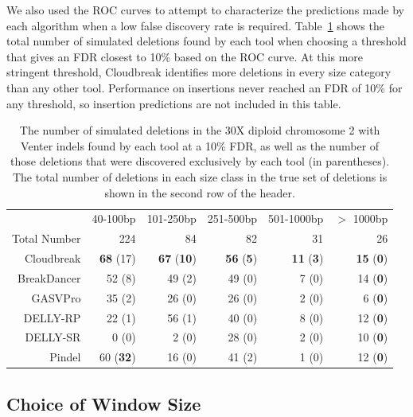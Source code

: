 We also used the ROC curves to attempt to characterize the predictions made by each algorithm when a low false discovery rate is required. Table~\ref{chr2DeletionPredsFDR10} shows the total number of simulated deletions found by each tool when choosing a threshold that gives an FDR closest to 10\% based on the ROC curve. At this more stringent threshold, Cloudbreak identifies more deletions in every size category than any other tool. Performance on insertions never reached an FDR of 10\% for any threshold, so insertion predictions are not included in this table. 

\begin{table}
\begin{center}
\begin{tabular}{rrrrrr}
 \hline
 & 40-100bp & 101-250bp & 251-500bp & 501-1000bp & $>$ 1000bp \\ 
 Total Number & 224 & 84 & 82 & 31 & 26\\ 
 \hline
 Cloudbreak & \textbf{68} (17) & \textbf{67} (\textbf{10}) & \textbf{56} (\textbf{5}) & \textbf{11} (\textbf{3}) & \textbf{15} (\textbf{0}) \\ 
 BreakDancer & 52 (8) & 49 (2) & 49 (0) & 7 (0) & 14 (\textbf{0}) \\ 
 GASVPro  & 35 (2) & 26 (0) & 26 (0) & 2 (0) & 6 (\textbf{0}) \\ 
 DELLY-RP  & 22 (1) & 56 (1) & 40 (0) & 8 (0) & 12 (\textbf{0}) \\ 
 DELLY-SR  & 0 (0) & 2 (0) & 28 (0) & 2 (0) & 10 (\textbf{0}) \\ 
 Pindel  & 60 (\textbf{32}) & 16 (0) & 41 (2) & 1 (0) & 12 (\textbf{0})\\ 
 \hline
\end{tabular}
\end{center}
\caption{The number of simulated deletions in the 30X diploid chromosome 2 with Venter indels found by each tool at a 10\% FDR, as well as the number of those deletions that were discovered exclusively by each tool (in parentheses). The total number of deletions in each size class in the true set of deletions is shown in the second row of the header.}
\label{chr2DeletionPredsFDR10}
\end{table}

\subsection{Choice of Window Size}\label{section_window_size}

